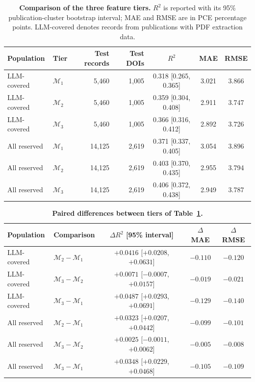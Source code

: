 \documentclass[3p]{elsarticle}
\begin{document}
\begin{table}[htbp]
    \centering\small
    \caption{\textbf{Comparison of the three feature tiers.} $R^2$ is reported with its 95\% publication-cluster bootstrap interval; MAE and RMSE are in PCE percentage points. LLM-covered denotes records from publications with PDF extraction data.}
    \label{tab:three}
    \begin{tabular}{llrrccc}
        \toprule
        Population & Tier & Test records & Test DOIs & $R^2$ & MAE & RMSE \\
        \midrule
        LLM-covered & $\mathcal{M}_1$ & 5,460 & 1,005 & 0.318 [0.265, 0.365] & 3.021 & 3.866 \\
        LLM-covered & $\mathcal{M}_2$ & 5,460 & 1,005 & 0.359 [0.304, 0.408] & 2.911 & 3.747 \\
        LLM-covered & $\mathcal{M}_3$ & 5,460 & 1,005 & 0.366 [0.316, 0.412] & 2.892 & 3.726 \\
        \midrule
        All reserved & $\mathcal{M}_1$ & 14,125 & 2,619 & 0.371 [0.337, 0.405] & 3.054 & 3.896 \\
        All reserved & $\mathcal{M}_2$ & 14,125 & 2,619 & 0.403 [0.370, 0.435] & 2.955 & 3.794 \\
        All reserved & $\mathcal{M}_3$ & 14,125 & 2,619 & 0.406 [0.372, 0.438] & 2.949 & 3.787 \\
        \bottomrule
    \end{tabular}
\end{table}

\begin{table}[htbp]
    \centering\small
    \caption{\textbf{Paired differences between tiers of Table~\ref{tab:three}.}}
    \label{tab:paired3}
    \begin{tabular}{llccc}
        \toprule
        Population & Comparison & $\Delta R^2$ [95\% interval] & $\Delta$MAE & $\Delta$RMSE \\
        \midrule
        LLM-covered & $\mathcal{M}_2 - \mathcal{M}_1$ & $+0.0416$ [$+0.0208$, $+0.0631$] & $-0.110$ & $-0.120$ \\
        LLM-covered & $\mathcal{M}_3 - \mathcal{M}_2$ & $+0.0071$ [$-0.0007$, $+0.0157$] & $-0.019$ & $-0.021$ \\
        LLM-covered & $\mathcal{M}_3 - \mathcal{M}_1$ & $+0.0487$ [$+0.0293$, $+0.0691$] & $-0.129$ & $-0.140$ \\
        \midrule
        All reserved & $\mathcal{M}_2 - \mathcal{M}_1$ & $+0.0323$ [$+0.0207$, $+0.0442$] & $-0.099$ &  $-0.101$ \\
        All reserved & $\mathcal{M}_3 - \mathcal{M}_2$ & $+0.0025$ [$-0.0011$, $+0.0062$] & $-0.005$ & $-0.008$ \\
        All reserved & $\mathcal{M}_3 - \mathcal{M}_1$ & $+0.0348$ [$+0.0229$, $+0.0468$] & $-0.105$ & $-0.109$ \\
        \bottomrule
    \end{tabular}
\end{table}
\end{document}
